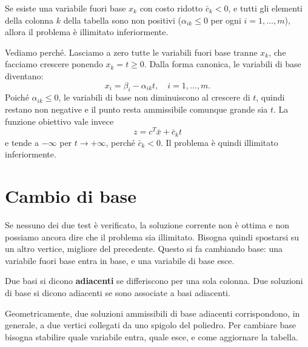 \begin{teorema}\label{teo:illimitatezza}
Se esiste una variabile fuori base $x_k$ con costo ridotto $\bar{c}_k < 0$, e tutti gli elementi della colonna $k$ della tabella sono non positivi ($\alpha_{ik} \le 0$ per ogni $i = 1, \dots, m$), allora il problema è illimitato inferiormente.
\end{teorema}

Vediamo perché. Lasciamo a zero tutte le variabili fuori base tranne $x_k$, che facciamo crescere ponendo $x_k = t \ge 0$. Dalla forma canonica, le variabili di base diventano:
\[
x_i = \beta_i - \alpha_{ik} t, \quad i = 1, \dots, m.
\]
Poiché $\alpha_{ik} \le 0$, le variabili di base non diminuiscono al crescere di $t$, quindi restano non negative e il punto resta ammissibile comunque grande sia $t$. La funzione obiettivo vale invece
\[
z = c^T \bar{x} + \bar{c}_k t
\]
e tende a $-\infty$ per $t \to +\infty$, perché $\bar{c}_k < 0$. Il problema è quindi illimitato inferiormente.

\section{Cambio di base}\label{sec:cambio-base}
Se nessuno dei due test è verificato, la soluzione corrente non è ottima e non possiamo ancora dire che il problema sia illimitato. Bisogna quindi spostarsi su un altro vertice, migliore del precedente. Questo si fa cambiando base: una variabile fuori base entra in base, e una variabile di base esce.

\begin{definizione}
Due basi si dicono \textbf{adiacenti} se differiscono per una sola colonna. Due soluzioni di base si dicono adiacenti se sono associate a basi adiacenti.
\end{definizione}

Geometricamente, due soluzioni ammissibili di base adiacenti corrispondono, in generale, a due vertici collegati da uno spigolo del poliedro. Per cambiare base bisogna stabilire quale variabile entra, quale esce, e come aggiornare la tabella.

